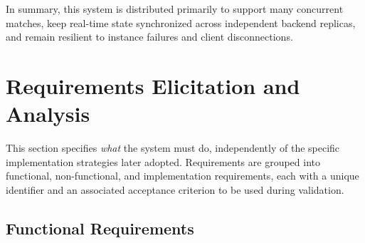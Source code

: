 \documentclass{scrartcl}
\begin{document}
In summary, this system is distributed primarily to support many concurrent matches, keep real-time state synchronized across independent backend replicas, and remain resilient to instance failures and client disconnections.

\section{Requirements Elicitation and Analysis}\label{requirements}

This section specifies \emph{what} the system must do, independently of the specific implementation strategies later adopted. Requirements are grouped into functional, non-functional, and implementation requirements, each with a unique identifier and an associated acceptance criterion to be used during validation.

\subsection{Functional Requirements}
\end{document}
